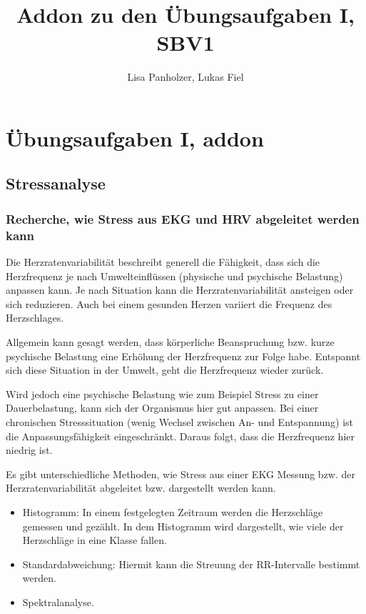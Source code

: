 \documentclass[12pt]{article}
\begin{document}
\title{Addon zu den Übungsaufgaben I, SBV1 }
\author{Lisa Panholzer, Lukas Fiel}
\maketitle


\newpage
\section{Übungsaufgaben I, addon}
\subsection{Stressanalyse}

\subsubsection{Recherche, wie Stress aus EKG und HRV abgeleitet werden kann}
Die Herzratenvariabilität beschreibt generell die Fähigkeit, dass sich die Herzfrequenz je nach Umwelteinflüssen (physische und psychische Belastung) anpassen kann. Je nach Situation kann die Herzratenvariabilität ansteigen oder sich reduzieren. Auch bei einem gesunden Herzen variiert die Frequenz des Herzschlages.

Allgemein kann gesagt werden, dass körperliche Beanspruchung bzw. kurze psychische Belastung eine Erhöhung der Herzfrequenz zur Folge habe. Entspannt sich diese Situation in der Umwelt, geht die Herzfrequenz wieder zurück. 

Wird jedoch eine psychische Belastung wie zum Beispiel Stress zu einer Dauerbelastung, kann sich der Organismus hier gut anpassen. Bei einer chronischen Stresssituation (wenig Wechsel zwischen An- und Entspannung) ist die Anpassungsfähigkeit eingeschränkt. Daraus folgt, dass die Herzfrequenz hier niedrig ist.

Es gibt unterschiedliche Methoden, wie Stress aus einer EKG Messung bzw. der Herzratenvariabilität abgeleitet bzw. dargestellt werden kann.

\begin{itemize}
	\item Histogramm: In einem festgelegten Zeitraum werden die Herzschläge gemessen und gezählt. In dem Histogramm wird dargestellt, wie viele der Herzschläge in eine Klasse fallen.
	\item Standardabweichung: Hiermit kann die Streuung der RR-Intervalle bestimmt werden.
	\item Spektralanalyse.
\end{itemize}
\end{document}
